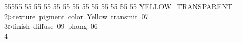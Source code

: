 %
%
\begin{tabbing}
55555 \= 55 \= 55 \= 55 \= 55 \= 55 \= 55 \= 55 \= 55 \= 55 \= 55 \= 55 \= 55 \= \>YELLOW\_TRANSPARENT=\\[0pt]
2\>$\triangleright$\>texture\ pigment\ color\ Yellow\ transmit\ 07\ \ \\[0pt]
3\>$\triangleright$\>finish\ diffuse\ 09\ phong\ 06\ \\[0pt]
4\>\end{tabbing}
